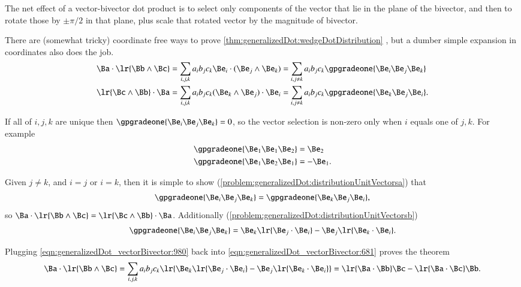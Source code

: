 The net effect of a vector-bivector dot product is to select only components of the vector that lie in the plane of the bivector, and then to rotate those by \( \pm \pi/2 \) in that plane, plus scale that rotated vector by the magnitude of bivector.

There are (somewhat tricky) coordinate free ways to prove
\cref{thm:generalizedDot:wedgeDotDistribution}
, but a dumber simple expansion in coordinates also does the job.
\begin{dmath}\label{eqn:generalizedDot_vectorBivector:681}
\begin{aligned}
\Ba \cdot \lr{ \Bb \wedge \Bc } &= \sum_{i, j, k} a_i b_j c_k \Be_i \cdot (\Be_j \wedge \Be_k)
= \sum_{i, j \ne k} a_i b_j c_k \gpgradeone{ \Be_i \Be_j \Be_k }
\\
\lr{ \Bc \wedge \Bb } \cdot \Ba &= \sum_{i, j, k} a_i b_j c_k (\Be_k \wedge \Be_j) \cdot \Be_i
= \sum_{i, j \ne k} a_i b_j c_k \gpgradeone{ \Be_k \Be_j \Be_i }.
\end{aligned}
\end{dmath}

If all of \( i, j, k \) are unique then \( \gpgradeone{ \Be_i \Be_j \Be_k } = 0 \), so the vector selection is non-zero only when \( i \) equals one of \( j, k \).
For example
\begin{dmath}\label{eqn:generalizedDot_vectorBivector:1040}
\begin{aligned}
\gpgradeone{ \Be_1 \Be_1 \Be_2 } &= \Be_2 \\
\gpgradeone{ \Be_1 \Be_2 \Be_1 } &= -\Be_1.
\end{aligned}
\end{dmath}

Given \( j \ne k \), and \( i = j \) or \( i = k \),  then it is simple to show
(\cref{problem:generalizedDot:distributionUnitVectorsa})
that
\begin{equation}\label{eqn:generalizedDot_vectorBivector:1020}
\gpgradeone{ \Be_i \Be_j \Be_k }
= \gpgradeone{ \Be_k \Be_j \Be_i },
\end{equation}
so \( \Ba \cdot \lr{ \Bb \wedge \Bc } = \lr{ \Bc \wedge \Bb } \cdot \Ba \).
Additionally
(\cref{problem:generalizedDot:distributionUnitVectorsb})
\begin{equation}\label{eqn:generalizedDot_vectorBivector:980}
\gpgradeone{ \Be_i \Be_j \Be_k }
=
\Be_k \lr{ \Be_j \cdot \Be_i }
-\Be_j \lr{ \Be_k \cdot \Be_i }.
\end{equation}

Plugging \cref{eqn:generalizedDot_vectorBivector:980} back into \cref{eqn:generalizedDot_vectorBivector:681} proves the theorem
\begin{dmath}\label{eqn:generalizedDot_vectorBivector:1060}
\Ba \cdot \lr{ \Bb \wedge \Bc }
= \sum_{i, j, k} a_i b_j c_k \lr{ \Be_k \lr{ \Be_j \cdot \Be_i }
-\Be_j \lr{ \Be_k \cdot \Be_i } }
=
\lr{ \Ba \cdot \Bb } \Bc
- \lr{ \Ba \cdot \Bc } \Bb.
\end{dmath}

